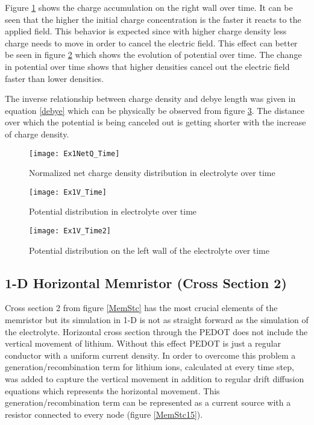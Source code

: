 Figure \ref{ElectrolyteQzoom} shows the charge accumulation on the right wall over time. It can be seen that the higher the initial charge concentration is the faster it reacts to the applied field. This behavior is expected since with higher charge density less charge needs to move in order to cancel the electric field. This effect can better be seen in figure \ref{ElectrolyteV} which shows the evolution of potential over time. The change in potential over time shows that higher densities cancel out the electric field faster than lower densities.

The inverse relationship between charge density and debye length was given in equation \ref{debye} which can be physically be observed from figure  \ref{ElectrolyteV2}. The distance over which the potential is being canceled out is getting shorter with the increase of charge density.  

 
\begin{landscape}
\begin{figure}[!htp]
\centering
\texttt{[image: Ex1NetQ\_Time]}
\caption{Normalized net charge density distribution in electrolyte over time} 
\label{ElectrolyteQzoom}
\end{figure}
\end{landscape}

\begin{landscape}
\begin{figure}[!htp]
\centering
\texttt{[image: Ex1V\_Time]}
\caption{Potential distribution in electrolyte over time} 
\label{ElectrolyteV}
\end{figure}
\end{landscape}

 
\begin{landscape}
\begin{figure}[!htp]
\centering
\texttt{[image: Ex1V\_Time2]}
\caption{Potential distribution on the left wall of the electrolyte over time} 
\label{ElectrolyteV2}
\end{figure}
\end{landscape}

\clearpage
\subsection{1-D Horizontal Memristor (Cross Section 2)}

Cross section 2 from figure \ref{MemStc} has the most crucial elements of the memristor but its simulation in 1-D is not as straight forward as the simulation of the electrolyte. Horizontal cross section through the PEDOT does not include the vertical movement of lithium. Without this effect PEDOT is just a regular conductor with a uniform current density. In order to overcome this problem a generation/recombination term for lithium ions, calculated at every time step, was added to capture the vertical movement in addition to regular drift diffusion equations which represents the horizontal movement. This generation/recombination term can be represented as a current source with a resistor connected to every node (figure \ref{MemStc15}). 

